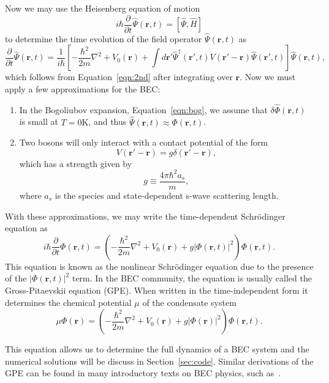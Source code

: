 Now we may use the Heisenberg equation of motion
\begin{equation}
    i\hbar \frac{\partial}{\partial t}\hat \Psi(\mathbf{r},t) = [\hat \Psi, \hat H]
\end{equation}
    to determine the time evolution of the field operator $\hat \Psi(\mathbf{r},t)$ as
\begin{equation}
    \frac{\partial}{\partial t}\hat \Psi(\mathbf{r},t) = \frac{1}{i\hbar}\left[-\frac{\hbar^2}{2m}\nabla^2 + V_0(\mathbf{r}) + \int d\mathbf{r'} \hat \Psi^\dagger(\mathbf{r'}, t)V(\mathbf{r'} -\mathbf{r})\hat \Psi(\mathbf{r'},t)\right]\hat \Psi(\mathbf{r},t),
\end{equation}
which follows from Equation~\eqref{eqn:2nd} after integrating over $\mathbf{r}$. 
Now we must apply a few approximations for the BEC:
\begin{enumerate}
    \item In the Bogoliubov expansion, Equation~\eqref{eqn:bog}, we assume that $\delta \hat \Phi(\mathbf{r},t)$ is small at $T = 0\text{K}$, and thus $\hat \Psi(\mathbf{r},t) \approx \Phi(\mathbf{r},t)$. 
    \item Two bosons will only interact with a contact potential of the form
    \begin{equation}
        V(\mathbf{r'}-\mathbf{r}) = g\delta(\mathbf{r'} - \mathbf{r}),
    \end{equation}
    which has a strength given by
    \begin{equation}
        g \equiv \frac{4 \pi \hbar^2 a_s}{m},
    \end{equation}
    where $a_s$ is the species and state-dependent s-wave scattering length.
\end{enumerate}

With these approximations, we may write the time-dependent Schr\"odinger equation as
\begin{equation}
    i\hbar \frac{\partial}{\partial t}\Phi(\mathbf{r},t) = \left( - \frac{\hbar^2}{2m} \nabla^2 + V_0(\mathbf{r}) + g |\Phi(\mathbf{r},t)|^2\right)\Phi(\mathbf{r},t).
\end{equation}
This equation is known as the nonlinear Schr\"odinger equation due to the presence of the $|\Phi(\mathbf{r},t)|^2$ term.
In the BEC community, the equation is usually called the Gross-Pitaevskii equation (GPE).
When written in the time-independent form it determines the chemical potential $\mu$ of the condensate system~\cite{Gross1961, Pitaevskii1961}
\begin{equation}
    \mu\Phi(\mathbf{r}) = \left( - \frac{\hbar^2}{2m} \nabla^2 + V_0(\mathbf{r}) + g |\Phi(\mathbf{r})|^2\right)\Phi(\mathbf{r},t).
    \label{eqn:GP}
\end{equation}

This equation allows us to determine the full dynamics of a BEC system and the numerical solutions will be discuss in Section~\ref{sec:code}. Similar derivations of the GPE can be found in many introductory texts on BEC physics, such as~\cite{Fetter2003,  Pethick2002, Fetter2009}.

